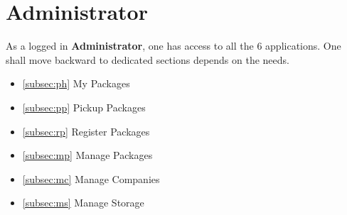 \pagebreak



\section{Administrator}
As a logged in \textbf{Administrator}, one has access to all the 6 applications. One shall move backward to dedicated sections depends on the needs. 

\begin{itemize}
    \item \ref{subsec:ph} My Packages
    \item \ref{subsec:pp} Pickup Packages
    \item \ref{subsec:rp} Register Packages
    \item \ref{subsec:mp} Manage Packages
    \item \ref{subsec:mc} Manage Companies
    \item \ref{subsec:ms} Manage Storage
\end{itemize}